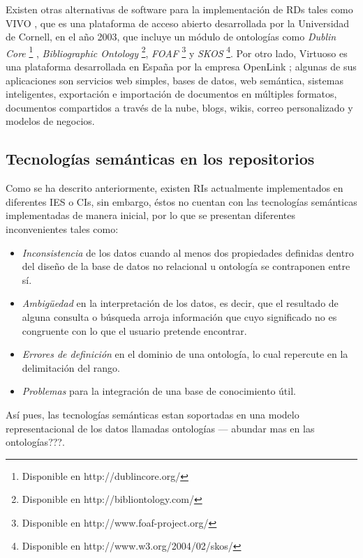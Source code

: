Existen otras alternativas de software para la implementación de RDs tales como VIVO \cite{VivoWeb}, que es una plataforma de acceso abierto desarrollada por la Universidad de Cornell, en el año 2003, que incluye un módulo de ontologías como \textit{Dublin Core} \footnote{Disponible en http://dublincore.org/} , \textit{Bibliographic Ontology} \footnote{Disponible en http://bibliontology.com/}, \textit{FOAF} \footnote{Disponible en http://www.foaf-project.org/} y \textit{SKOS} \footnote{Disponible en http://www.w3.org/2004/02/skos/}. Por otro lado, Virtuoso es una plataforma desarrollada en España por la empresa OpenLink \cite{VirtuosoRef}; algunas de sus aplicaciones son servicios web simples, bases de datos, web semántica, sistemas inteligentes, exportación e importación de documentos en múltiples formatos, documentos compartidos a través de la nube, blogs, wikis, correo personalizado y modelos de negocios.\newline

\subsection{Tecnologías semánticas en los repositorios}

Como se ha descrito anteriormente, existen RIs actualmente implementados en di\-fe\-ren\-tes IES o CIs, sin embargo, éstos no cuentan con las tecnologías semánticas implementadas de manera inicial, por lo que se presentan diferentes inconvenientes tales como:

\begin{itemize}
\item \textit{Inconsistencia} de los datos cuando al menos dos propiedades definidas dentro del diseño de la base de datos no relacional u ontología se contraponen entre sí.
\item \textit{Ambigüedad} en la interpretación de los datos, es decir, que el resultado de alguna consulta o búsqueda arroja información que cuyo significado no es congruente con lo que el usuario pretende encontrar.
\item \textit{Errores de definición} en el dominio de una ontología, lo cual repercute en la delimitación del rango.
\item \textit{Problemas} para la integración de una base de conocimiento útil.
\end{itemize}

Así pues, las tecnologías semánticas estan soportadas en una modelo representacional de los datos llamadas ontologías --- abundar mas en las ontologías???.

